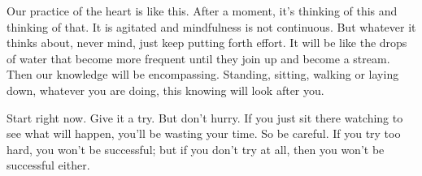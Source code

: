  Our practice of the heart is like this. After a moment, it's thinking of this and thinking of that. It is agitated and mindfulness is not continuous. But whatever it thinks about, never mind, just keep putting forth effort. It will be like the drops of water that become more frequent until they join up and become a stream. Then our knowledge will be encompassing. Standing, sitting, walking or laying down, whatever you are doing, this knowing will look after you. 

 Start right now. Give it a try. But don't hurry. If you just sit there watching to see what will happen, you'll be wasting your time. So be careful. If you try too hard, you won't be successful; but if you don't try at all, then you won't be successful either.

 
